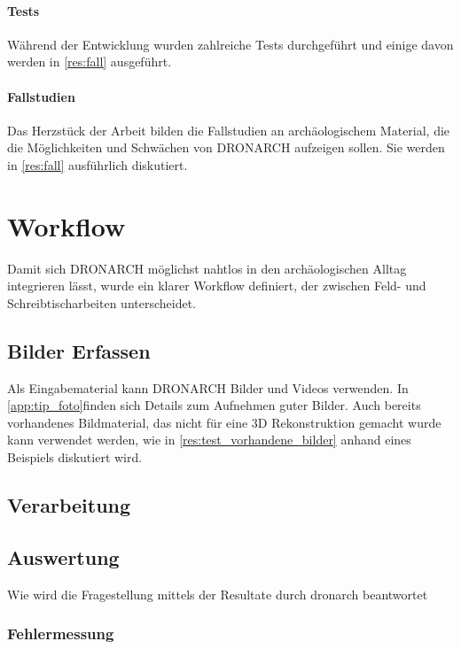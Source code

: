 		\paragraph{Tests}
		Während der Entwicklung wurden zahlreiche Tests durchgeführt und einige davon werden in \autoref{res:fall} ausgeführt.
		
		\paragraph{Fallstudien}
		Das Herzstück der Arbeit bilden die Fallstudien an archäologischem Material, die die Möglichkeiten und Schwächen von DRONARCH aufzeigen sollen. Sie werden in \autoref{res:fall} ausführlich diskutiert.
		
	\section{Workflow}
		Damit sich DRONARCH möglichst nahtlos in den archäologischen Alltag integrieren lässt, wurde ein klarer Workflow definiert, der zwischen Feld- und Schreibtischarbeiten unterscheidet.
		
		\subsection{Bilder Erfassen}
			Als Eingabematerial kann DRONARCH Bilder und Videos verwenden. In \autoref{app:tip_foto}finden sich Details zum Aufnehmen guter Bilder.
			Auch bereits vorhandenes Bildmaterial, das nicht für eine 3D Rekonstruktion gemacht wurde kann  verwendet werden, wie in \autoref{res:test_vorhandene_bilder} anhand eines Beispiels diskutiert wird.
		
		\subsection{Verarbeitung}
		
		\subsection{Auswertung}
			Wie wird die Fragestellung mittels der Resultate durch dronarch beantwortet
			\subsubsection{Fehlermessung}
				